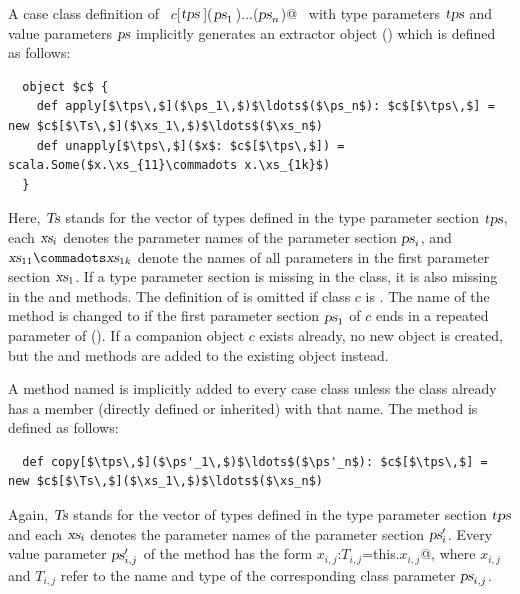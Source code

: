 A case class definition of ~\lstinline@$c$[$\mbox{\sl tps}\,$]($\mbox{\sl ps}_1\,$)$\ldots$($\mbox{\sl ps}_n$)@~ with type
parameters $\mbox{\sl tps}$ and value parameters $\mbox{\sl ps}$ implicitly
generates an extractor object () which is
defined as follows:
\begin{lstlisting}
  object $c$ {
    def apply[$\tps\,$]($\ps_1\,$)$\ldots$($\ps_n$): $c$[$\tps\,$] = new $c$[$\Ts\,$]($\xs_1\,$)$\ldots$($\xs_n$)
    def unapply[$\tps\,$]($x$: $c$[$\tps\,$]) = scala.Some($x.\xs_{11}\commadots x.\xs_{1k}$)
  }
\end{lstlisting}
Here,
 $\mbox{\sl Ts}$ stands for the vector of types defined in the type
parameter section $\mbox{\sl tps}$,
each $\mbox{\sl xs}_i$ denotes the parameter names of the parameter
section $\mbox{\sl ps}_i$, and
$\xs_{11}\commadots \xs_{1k}$ denote the names of all parameters
in the first parameter section $\mbox{\sl xs}_1$.
If a type parameter section is missing in the
class, it is also missing in the \lstinline@apply@ and
\lstinline@unapply@ methods.
The definition of \lstinline@apply@ is omitted if class $c$ is \lstinline@abstract@.
The name of the \lstinline@unapply@ method is changed to \lstinline@unapplySeq@ if the first
parameter section $\mbox{\sl ps}_1$ of $c$ ends in a repeated parameter of (). 
If a companion object $c$ exists already, no new object is created,
but the \lstinline@apply@ and \lstinline@unapply@ methods are added to the existing
object instead.

A method named  is implicitly added to every case class unless the
class already has a member (directly defined or inherited) with that name. The
method is defined as follows:
\begin{lstlisting}
  def copy[$\tps\,$]($\ps'_1\,$)$\ldots$($\ps'_n$): $c$[$\tps\,$] = new $c$[$\Ts\,$]($\xs_1\,$)$\ldots$($\xs_n$)
\end{lstlisting}
Again, $\mbox{\sl Ts}$ stands for the vector of types defined in the type parameter section $\mbox{\sl tps}$
and each $\mbox{\sl xs}_i$ denotes the parameter names of the parameter section $\mbox{\sl ps}'_i$. Every value
parameter $\mbox{\sl ps}'_{i,j}$ of the  method has the form \lstinline@$x_{i,j}$:$T_{i,j}$=this.$x_{i,j}$@,
where $x_{i,j}$ and $T_{i,j}$ refer to the name and type of the corresponding class parameter
$\mbox{\sl ps}_{i,j}$.

